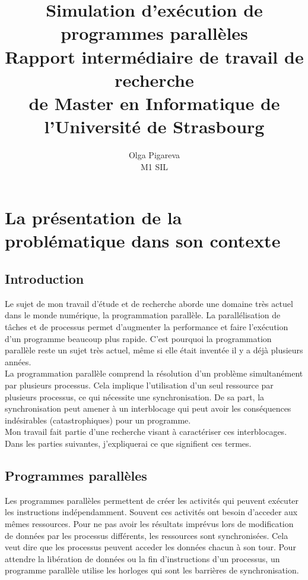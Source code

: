 \documentclass[12pt]{report}
\title{%
Simulation d'exécution de programmes parallèles\\
\large 
Rapport intermédiaire de travail de recherche\\ 
de Master en Informatique de l'Université de Strasbourg }
\author{Olga Pigareva\\
M1 SIL} %
\begin{document}
\maketitle

\tableofcontents %

\newpage %

\section{La présentation de la problématique dans son contexte}

\subsection{Introduction}
Le sujet de mon travail d'étude et de recherche aborde une domaine très actuel dans le monde numérique, la programmation parallèle.
La parallélisation de tâches et de processus permet d'augmenter la performance et faire l'exécution d'un programme beaucoup plus rapide. 
C'est pourquoi la programmation parallèle reste un sujet très actuel, même si elle était inventée il y a déjà plusieurs années.\\

La programmation parallèle comprend la résolution d'un problème simultanément par plusieurs processus.
Cela implique l'utilisation d'un seul ressource par plusieurs processus, ce qui nécessite une synchronisation.
De sa part, la synchronisation peut amener à un interblocage qui peut avoir les conséquences indésirables (catastrophiques) pour un programme. \\
Mon travail fait partie d'une recherche visant à caractériser ces interblocages.\\
Dans les parties suivantes, j'expliquerai ce que signifient ces termes.   

\subsection{Programmes parallèles}

Les programmes parallèles permettent de créer les activités qui peuvent exécuter les instructions indépendamment. 
Souvent ces activités ont besoin d'acceder aux mêmes ressources. 
Pour ne pas avoir les résultats imprévus lors de modification de données par les processus différents, les ressources sont synchronisées. 
Cela veut dire que les processus peuvent acceder les données chacun à son tour. 
Pour attendre la libération de données ou la fin d'instructions d'un processus, un programme parallèle utilise les horloges qui sont les barrières de synchronisation.
\newpage
\end{document}
